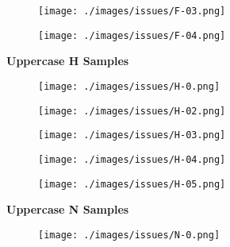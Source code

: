 \begin{figure}[H]
\begin{subfigure}{.10\textwidth}
        \label{fig:issue_F02}
    \end{subfigure}%
    \begin{subfigure}{.10\textwidth}
        \centering
        \texttt{[image: ./images/issues/F-03.png]}
        \label{fig:issue_F03}
    \end{subfigure}%
    \begin{subfigure}{.10\textwidth}
        \centering
        \texttt{[image: ./images/issues/F-04.png]}
        \label{fig:issue_F04}
    \end{subfigure}\par\medskip
    \textbf{Uppercase H Samples}\par\medskip
    \begin{subfigure}{.10\textwidth}
        \centering
        \texttt{[image: ./images/issues/H-0.png]}
        \label{fig:issue_H0}
    \end{subfigure}%
    \begin{subfigure}{.10\textwidth}
        \centering
        \texttt{[image: ./images/issues/H-02.png]}
        \label{fig:issue_H01}
    \end{subfigure}%
    \begin{subfigure}{.10\textwidth}
        \centering
        \texttt{[image: ./images/issues/H-03.png]}
        \label{fig:issue_H02}
    \end{subfigure}%
    \begin{subfigure}{.10\textwidth}
        \centering
        \texttt{[image: ./images/issues/H-04.png]}
        \label{fig:issue_H03}
    \end{subfigure}%
    \begin{subfigure}{.10\textwidth}
        \centering
        \texttt{[image: ./images/issues/H-05.png]}
        \label{fig:issue_H04}
    \end{subfigure}\par\medskip
    \textbf{Uppercase N Samples}\par\medskip
    \begin{subfigure}{.10\textwidth}
        \centering
        \texttt{[image: ./images/issues/N-0.png]}

\end{subfigure}
\end{figure}
